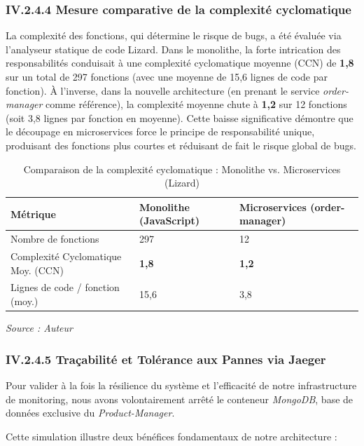 \subsubsection{IV.2.4.4 Mesure comparative de la complexité cyclomatique}
La complexité des fonctions, qui détermine le risque de bugs, a été évaluée via l'analyseur statique de code Lizard. Dans le monolithe, la forte intrication des responsabilités conduisait à une complexité cyclomatique moyenne (CCN) de \textbf{1,8} sur un total de 297 fonctions (avec une moyenne de 15,6 lignes de code par fonction). À l'inverse, dans la nouvelle architecture (en prenant le service \textit{order-manager} comme référence), la complexité moyenne chute à \textbf{1,2} sur 12 fonctions (soit 3,8 lignes par fonction en moyenne). Cette baisse significative démontre que le découpage en microservices force le principe de responsabilité unique, produisant des fonctions plus courtes et réduisant de fait le risque global de bugs.
\begin{table}[H]
    \centering
    \renewcommand{\arraystretch}{1.4}
    \begin{tabular}{|p{4.5cm}|p{4.5cm}|p{4.5cm}|}
        \hline
        \textbf{Métrique} & \textbf{Monolithe (JavaScript)} & \textbf{Microservices (order-manager)} \\
        \hline
        Nombre de fonctions & 297 & 12 \\
        \hline
        Complexité Cyclomatique Moy. (CCN) & \textbf{1,8} & \textbf{1,2} \\
        \hline
        Lignes de code / fonction (moy.) & 15,6 & 3,8 \\
        \hline
    \end{tabular}
    \caption{Comparaison de la complexité cyclomatique : Monolithe vs. Microservices (Lizard)}
    \vspace{0.2cm}\small\textit{Source : Auteur}
    \label{tab:metrics_complexity}
\end{table}


\subsubsection{IV.2.4.5 Traçabilité et Tolérance aux Pannes via Jaeger}

Pour valider à la fois la résilience du système et l'efficacité de notre infrastructure de monitoring, nous avons volontairement arrêté le conteneur \textit{MongoDB}, base de données exclusive du \textit{Product-Manager}.

Cette simulation illustre deux bénéfices fondamentaux de notre architecture :

